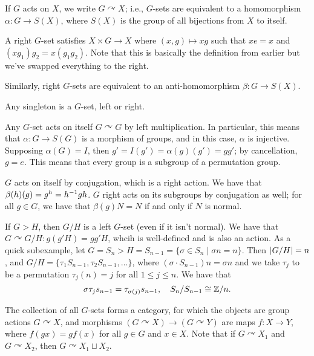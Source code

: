 \noindent If $G$ acts on $X$, we write $G \curvearrowright X$; i.e., $G$-sets are equivalent to a homomorphism $\alpha : G \to S(X)$, where $S(X)$ is the group of all bijections from $X$ to itself.
\begin{definition}
    A right $G$-set satisfies $X \times G \to X$ where $(x, g) \mapsto xg$ such that $xe = x$ and $(xg_1)g_2 = x(g_1g_2)$. Note that this is basically the definition from earlier but we've swapped everything to the right.
\end{definition}
\noindent Similarly, right $G$-sets are equivalent to an anti-homomorphism $\beta : G \to S(X)$.
\begin{example}
    Any singleton is a $G$-set, left or right.
\end{example}
\begin{example}
    Any $G$-set acts on itself $G \curvearrowright G$ by left multiplication. In particular, this means that $\alpha : G \to S(G)$ is a morphism of groups, and in this case, $\alpha$ is injective. Supposing $\alpha(G) = I$, then $g' = I(g') = \alpha(g)(g') = gg'$; by cancellation, $g = e$. This means that every group is a subgroup of a permutation group.
\end{example}
\begin{example}
    $G$ acts on itself by conjugation, which is a right action. We have that $\beta(h)(g) = g^h = h^{-1} g h$. $G$ right acts on its subgroups by conjugation as well; for all $g \in G$, we have that $\beta(g) N = N$ if and only if $N$ is normal.
\end{example}
\begin{example}
    If $G > H$, then $G/H$ is a left $G$-set (even if it isn't normal). We have that $G \curvearrowright G/H : g(g'H) = gg'H$, whcih is well-defined and is also an action. As a quick subexample, let $G = S_n > H = S_{n-1} = \{\sigma \in S_n \mid \sigma n = n\}$. Then $\left\lvert G/H \right\rvert = n$, and $G/H = \{\tau_1 S_{n-1}, \tau_2 S_{n-1}, \dots\}$, where $(\sigma \cdot S_{n-1}) n = \sigma n$ and we take $\tau_j$ to be a permutation $\tau_j(n) = j$ for all $1 \leq j \leq n$. We have that
    \[ \sigma \tau_j s_{n-1} = \tau_{\sigma(j)} s_{n-1}, \quad S_n/S_{n-1} \cong \mathbb Z/n. \]
\end{example}
\begin{claim}
    The collection of all $G$-sets forms a category, for which the objects are group actions $G \curvearrowright X$, and morphisms $(G \curvearrowright X) \to (G \curvearrowright Y)$ are maps $f : X \to Y$, where $f(gx) = gf(x)$ for all $g \in G$ and $x \in X$. Note that if $G \curvearrowright X_1$ and $G \curvearrowright X_2$, then $G \curvearrowright X_1 \sqcup X_2$.
\end{claim}
